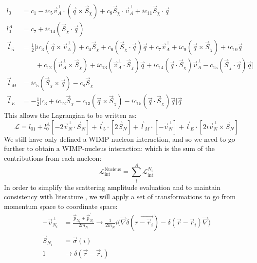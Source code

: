 \begin{equation}
\begin{split}
    l_0  & = c_1 - ic_5 \vec{v}^{\perp}_{A} \cdot(\vec{q} \times \vec{S}_\chi) + c_8 \vec{S}_\chi \cdot \vec{v}^{\perp}_{A} + ic_{11} \vec{S}_\chi \cdot \vec{q} \\
    l^A_0 &= c_7 + ic_{14} (\vec{S}_\chi \cdot \vec{q}) \\
    \vec{l}_5 &= \frac{1}{2} \big[ ic_3 (\vec{q} \times \vec{v}^{\perp}_{A}) + c_4 \vec{S}_\chi + c_6 (\vec{S}_\chi \cdot \vec{q}) \vec{q} + c_7 \vec{v}^{\perp}_{A} + ic_9 (\vec{q} \times \vec{S}_\chi) + ic_{10} \vec{q} \\
    &\qquad+ c_12 (\vec{v}^{\perp}_{A} \times \vec{S}_\chi) + ic_{13} (\vec{v}^{\perp}_{A} \cdot \vec{S}_\chi) \vec{q} + ic_{14}(\vec{q} \cdot \vec{S}_\chi)\vec{v}^{\perp}_{A} - c_{15} (\vec{S}_\chi \cdot \vec{q} ) \vec{q} \bigg] \\
    \vec{l}_M &= ic_5 (\vec{S}_\chi \times \vec{q}) - c_8 \vec{S}_\chi \\
    \vec{l}_E &= -\frac{1}{2} \bigg[ c_3 + ic_{12} \vec{S}_\chi - c_{13} (\vec{q} \times \vec{S}_\chi) - ic_{15} (\vec{q} \cdot \vec{S}_{\chi}) \vec{q} \bigg] \vec{q}
\end{split}
\label{eq:eft_operator_lagrangian_charges_and_currents_2}
\end{equation}
This allows the Lagrangian to be written as:
\begin{equation}
    \mathcal{L} = l_01 + l_0^A[-2\vec{v}^{\perp}_N \cdot \vec{S}_N] + \vec{l}_{5} \cdot [2\vec{S}_N] + \vec{l}_{M} \cdot [-\vec{v}^{\perp}_N] + \vec{l}_{E} \cdot [2i\vec{v}^{\perp}_N \times \vec{S}_{N} ]
\end{equation}
We still have only defined a WIMP-nucleon interaction, and so we need to go further to obtain a WIMP-nucleus interaction: which is the sum of the contributions from each nucleon:
\begin{equation}
    \mathcal{L}^{\text{Nucleus}}_{\text{int}} = \sum_{i}^{A} \mathcal{L}^{N_i}_{\text{int}}
\end{equation}
In order to simplify the scattering amplitude evaluation and to maintain consistency with literature \cite{Fitzpatrick_2013_ref}, we will apply a set of transformations to go from momentum space to coordinate space:
\begin{equation}
    \begin{split}
        -\vec{v}^{\perp}_{N_i} &= \frac{\vec{p}_{N_i} + \vec{p}^{'}_{N_i}}{2m_N} \rightarrow \frac{1}{2m_N}i \Bigg( \vec{\nabla}\delta(\vec{r - \vec{r}_i}) - \delta(\vec{r} - \vec{r}_i) \vec{\nabla} \Bigg) \\
        \vec{S}_{N_i} &= \vec{\sigma}(i) \\
        1 &\rightarrow \delta(\vec{r} - \vec{r}_i)
    \end{split}
\end{equation}
